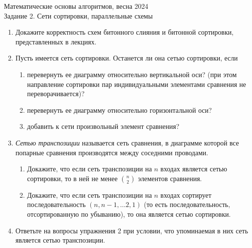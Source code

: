 \documentclass[11pt]{article}
\newenvironment{exercise}{\item}{}
\begin{document}
\begin{center}
	\Large Математические основы алгоритмов, весна 2024 \\
	\Large Задание 2. Сети сортировки, параллельные схемы
\end{center}

\begin{enumerate}

\begin{exercise}
Докажите корректность схем битонного слияния и битонной сортировки, представленных в лекциях.
\end{exercise}


\begin{exercise}
Пусть имеется сеть сортировки. Останется ли она сетью сортировки, если

\begin{enumerate}
\item перевернуть ее диаграмму относительно вертикальной оси?
(при этом направление сортировки пар индивидуальными элементами сравнения не переворачивается)?

\item перевернуть ее диаграмму относительно горизонтальной оси?

\item добавить к сети произвольный элемент сравнения?
\end{enumerate}
\end{exercise}


\begin{exercise}

\emph{Сетью транспозиции} называется сеть сравнения, 
в диаграмме которой все попарные сравнения производятся между соседними проводами.

\begin{enumerate}
\item Докажите, что если сеть транспозиции на $n$ входах является сетью сортировки,
то в ней не менее $\binom{n}{2}$ элементов сравнения.

\item Докажите, что если сеть транспозиции на $n$ входах сортирует последовательность
$(n, n-1, \ldots 2, 1)$ (то есть последовательность, отсортированную по убыванию),
то она является сетью сортировки.
\end{enumerate}
\end{exercise}


\begin{exercise}
Ответьте на вопросы упражнения 2 при условии, что упоминаемая в них сеть является сетью транспозиции.
\end{exercise}



\end{enumerate}
\end{document}
